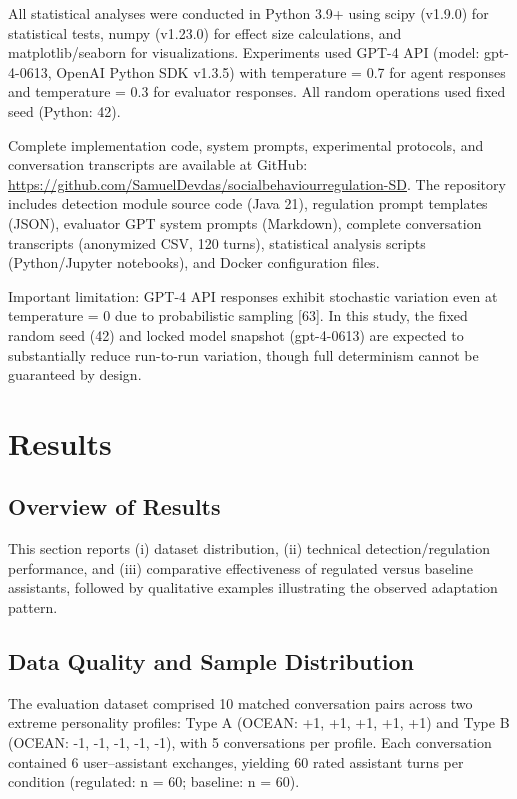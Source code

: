 \documentclass[apajournal,article,submit,moreauthors]{Definitions/mdpi}
\begin{document}
All statistical analyses were conducted in Python 3.9+ using scipy (v1.9.0) for statistical tests, numpy (v1.23.0) for effect size calculations, and matplotlib/seaborn for visualizations. Experiments used GPT-4 API (model: gpt-4-0613, OpenAI Python SDK v1.3.5) with temperature = 0.7 for agent responses and temperature = 0.3 for evaluator responses. All random operations used fixed seed (Python: 42).

Complete implementation code, system prompts, experimental protocols, and conversation transcripts are available at GitHub: \url{https://github.com/SamuelDevdas/socialbehaviourregulation-SD}. The repository includes detection module source code (Java 21), regulation prompt templates (JSON), evaluator GPT system prompts (Markdown), complete conversation transcripts (anonymized CSV, 120 turns), statistical analysis scripts (Python/Jupyter notebooks), and Docker configuration files.

Important limitation: GPT-4 API responses exhibit stochastic variation even at temperature = 0 due to probabilistic sampling {[}63{]}. In this study, the fixed random seed (42) and locked model snapshot (gpt-4-0613) are expected to substantially reduce run-to-run variation, though full determinism cannot be guaranteed by design.

\section{Results}\label{results}

\subsection{Overview of Results}\label{overview-of-results}

This section reports (i) dataset distribution, (ii) technical detection/regulation performance, and (iii) comparative effectiveness of regulated versus baseline assistants, followed by qualitative examples illustrating the observed adaptation pattern.

\subsection{Data Quality and Sample Distribution}\label{data-quality-and-sample-distribution}

The evaluation dataset comprised 10 matched conversation pairs across two extreme personality profiles: Type A (OCEAN: +1, +1, +1, +1, +1) and Type B (OCEAN: -1, -1, -1, -1, -1), with 5 conversations per profile. Each conversation contained 6 user--assistant exchanges, yielding 60 rated assistant turns per condition (regulated: n = 60; baseline: n = 60).
\end{document}
